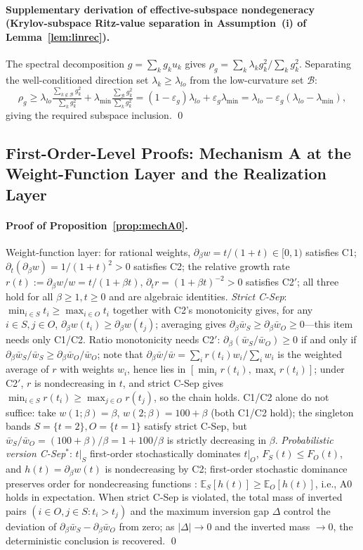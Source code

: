 \documentclass[11pt]{article}
\numberwithin{equation}{section}
\begin{document}
\paragraph{Supplementary derivation of effective-subspace nondegeneracy (Krylov-subspace Ritz-value separation in Assumption~(i) of Lemma~\ref{lem:linrec}).}
The spectral decomposition $g=\sum_kg_ku_k$ gives $\rho_g=\sum_k\lambda_kg_k^2/\sum_kg_k^2$. Separating the well-conditioned direction set $\lambda_k\ge\lambda_{lo}$ from the low-curvature set $\mathcal B$:
\[
\rho_g\ge\lambda_{lo}\tfrac{\sum_{k\notin\mathcal B}g_k^2}{\sum_kg_k^2}+\lambda_{\min}\tfrac{\sum_{\mathcal B}g_k^2}{\sum_kg_k^2}
=(1-\varepsilon_g)\lambda_{lo}+\varepsilon_g\lambda_{\min}=\lambda_{lo}-\varepsilon_g(\lambda_{lo}-\lambda_{\min}),
\]
giving the required subspace inclusion. \qed

\subsection{First-Order-Level Proofs: Mechanism A at the Weight-Function Layer and the Realization Layer}
\paragraph{Proof of Proposition~\ref{prop:mechA0}.}
Weight-function layer: for rational weights, $\partial_\beta w=t/(1+t)\in[0,1)$ satisfies C1; $\partial_t(\partial_\beta w)=1/(1+t)^2>0$ satisfies C2; the relative growth rate $r(t):=\partial_\beta w/w=t/(1+\beta t)$, $\partial_t r=(1+\beta t)^{-2}>0$ satisfies C2$'$; all three hold for all $\beta\ge1,t\ge0$ and are algebraic identities. \emph{Strict C-Sep}: $\min_{i\in S}t_i\ge\max_{i\in O}t_i$ together with C2's monotonicity gives, for any $i\in S,j\in O$, $\partial_\beta w(t_i)\ge\partial_\beta w(t_j)$; averaging gives $\partial_\beta\bar w_S\ge\partial_\beta\bar w_O\ge0$---this item needs only C1/C2. Ratio monotonicity needs C2$'$: $\partial_\beta(\bar w_S/\bar w_O)\ge0$ if and only if $\partial_\beta\bar w_S/\bar w_S\ge\partial_\beta\bar w_O/\bar w_O$; note that $\partial_\beta\bar w/\bar w=\sum_i r(t_i)w_i\big/\sum_i w_i$ is the weighted average of $r$ with weights $w_i$, hence lies in $[\min_i r(t_i),\max_i r(t_i)]$; under C2$'$, $r$ is nondecreasing in $t$, and strict C-Sep gives $\min_{i\in S}r(t_i)\ge\max_{j\in O}r(t_j)$, so the chain holds. C1/C2 alone do not suffice: take $w(1;\beta)=\beta$, $w(2;\beta)=100+\beta$ (both C1/C2 hold); the singleton bands $S=\{t=2\},O=\{t=1\}$ satisfy strict C-Sep, but $\bar w_S/\bar w_O=(100+\beta)/\beta=1+100/\beta$ is strictly decreasing in $\beta$. \emph{Probabilistic version C-Sep$^*$}: $t|_S$ first-order stochastically dominates $t|_O$, $F_S(t)\le F_O(t)$, and $h(t)=\partial_\beta w(t)$ is nondecreasing by C2; first-order stochastic dominance preserves order for nondecreasing functions \cite{Strassen1965}: $\mathbb E_S[h(t)]\ge\mathbb E_O[h(t)]$, i.e., A0 holds in expectation. When strict C-Sep is violated, the total mass of inverted pairs $(i\in O,j\in S:t_i>t_j)$ and the maximum inversion gap $\Delta$ control the deviation of $\partial_\beta\bar w_S-\partial_\beta\bar w_O$ from zero; as $|\Delta|\to0$ and the inverted mass $\to0$, the deterministic conclusion is recovered. \qed
\end{document}
